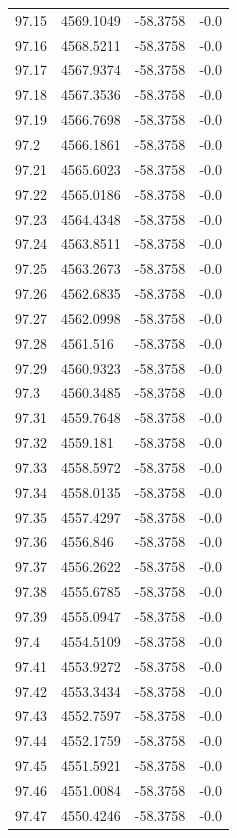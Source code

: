 \begin{table}[H]
\begin{tabular}{llll}
97.15 & 4569.1049 & -58.3758 & -0.0 \\
97.16 & 4568.5211 & -58.3758 & -0.0 \\
97.17 & 4567.9374 & -58.3758 & -0.0 \\
97.18 & 4567.3536 & -58.3758 & -0.0 \\
97.19 & 4566.7698 & -58.3758 & -0.0 \\
97.2 & 4566.1861 & -58.3758 & -0.0 \\
97.21 & 4565.6023 & -58.3758 & -0.0 \\
97.22 & 4565.0186 & -58.3758 & -0.0 \\
97.23 & 4564.4348 & -58.3758 & -0.0 \\
97.24 & 4563.8511 & -58.3758 & -0.0 \\
97.25 & 4563.2673 & -58.3758 & -0.0 \\
97.26 & 4562.6835 & -58.3758 & -0.0 \\
97.27 & 4562.0998 & -58.3758 & -0.0 \\
97.28 & 4561.516 & -58.3758 & -0.0 \\
97.29 & 4560.9323 & -58.3758 & -0.0 \\
97.3 & 4560.3485 & -58.3758 & -0.0 \\
97.31 & 4559.7648 & -58.3758 & -0.0 \\
97.32 & 4559.181 & -58.3758 & -0.0 \\
97.33 & 4558.5972 & -58.3758 & -0.0 \\
97.34 & 4558.0135 & -58.3758 & -0.0 \\
97.35 & 4557.4297 & -58.3758 & -0.0 \\
97.36 & 4556.846 & -58.3758 & -0.0 \\
97.37 & 4556.2622 & -58.3758 & -0.0 \\
97.38 & 4555.6785 & -58.3758 & -0.0 \\
97.39 & 4555.0947 & -58.3758 & -0.0 \\
97.4 & 4554.5109 & -58.3758 & -0.0 \\
97.41 & 4553.9272 & -58.3758 & -0.0 \\
97.42 & 4553.3434 & -58.3758 & -0.0 \\
97.43 & 4552.7597 & -58.3758 & -0.0 \\
97.44 & 4552.1759 & -58.3758 & -0.0 \\
97.45 & 4551.5921 & -58.3758 & -0.0 \\
97.46 & 4551.0084 & -58.3758 & -0.0 \\
97.47 & 4550.4246 & -58.3758 & -0.0 \\

\end{tabular}
\end{table}
